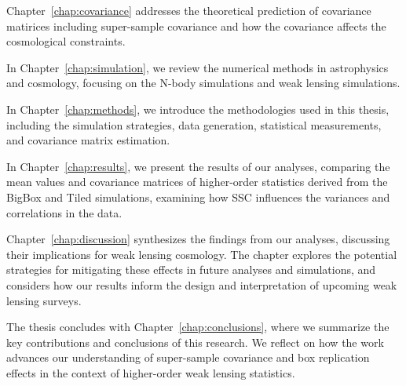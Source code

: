 Chapter~\ref{chap:covariance} addresses the theoretical prediction of covariance matirices including super-sample covariance and how the covariance affects the cosmological constraints. 

In Chapter~\ref{chap:simulation}, we review the numerical methods in astrophysics and cosmology, focusing on the N-body simulations and weak lensing simulations. 

In Chapter~\ref{chap:methods}, we introduce the methodologies used in this thesis, including the simulation strategies, data generation, statistical measurements, and covariance matrix estimation.

In Chapter~\ref{chap:results}, we present the results of our analyses, comparing the mean values and covariance matrices of higher-order statistics derived from the BigBox and Tiled simulations, examining how SSC influences the variances and correlations in the data.

Chapter~\ref{chap:discussion} synthesizes the findings from our analyses, discussing their implications for weak lensing cosmology. The chapter explores the potential strategies for mitigating these effects in future analyses and simulations, and considers how our results inform the design and interpretation of upcoming weak lensing surveys.

The thesis concludes with Chapter~\ref{chap:conclusions}, where we summarize the key contributions and conclusions of this research. We reflect on how the work advances our understanding of super-sample covariance and box replication effects in the context of higher-order weak lensing statistics.
